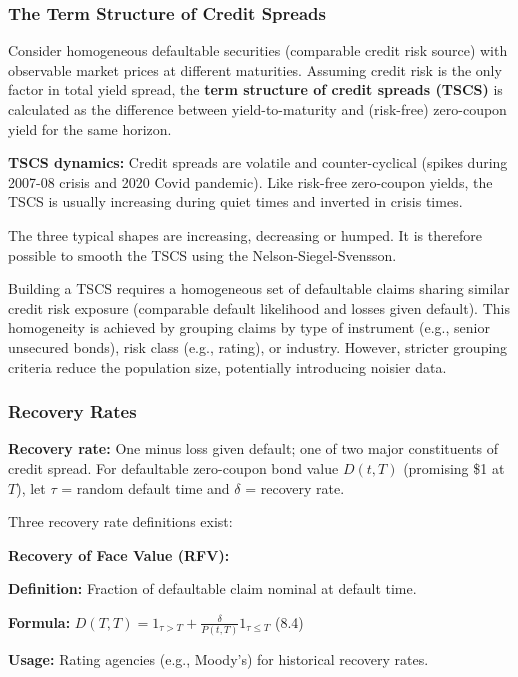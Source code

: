 \documentclass[12pt,a4paper]{article}
\begin{document}
\subsubsection{The Term Structure of Credit Spreads}

Consider homogeneous defaultable securities (comparable credit risk source) with observable market prices at different maturities. Assuming credit risk is the only factor in total yield spread, the \textbf{term structure of credit spreads (TSCS)} is calculated as the difference between yield-to-maturity and (risk-free) zero-coupon yield for the same horizon.

\textbf{TSCS dynamics:} Credit spreads are volatile and counter-cyclical (spikes during 2007-08 crisis and 2020 Covid pandemic). Like risk-free zero-coupon yields, the TSCS is usually increasing during quiet times and inverted in crisis times.

The three typical shapes are increasing, decreasing or humped. It is therefore possible to smooth 
the TSCS using the Nelson-Siegel-Svensson.

Building a TSCS requires a homogeneous set of defaultable claims sharing similar credit risk exposure (comparable default likelihood and losses given default). This homogeneity is achieved by grouping claims by type of instrument (e.g., senior unsecured bonds), risk class (e.g., rating), or industry. However, stricter grouping criteria reduce the population size, potentially introducing noisier data.

\subsubsection{Recovery Rates}

\textbf{Recovery rate:} One minus loss given default; one of two major constituents of credit spread. For defaultable zero-coupon bond value $D(t,T)$ (promising \$1 at $T$), let $\tau$ = random default time and $\delta$ = recovery rate.

Three recovery rate definitions exist:

\vspace{0.3em}
\noindent\textbf{Recovery of Face Value (RFV):}

\textbf{Definition:} Fraction of defaultable claim nominal at default time.

\textbf{Formula:} $D(T,T) = 1_{\tau>T} + \frac{\delta}{P(t,T)} 1_{\tau \leq T}$ \quad (8.4)

\textbf{Usage:} Rating agencies (e.g., Moody's) for historical recovery rates.
\end{document}
